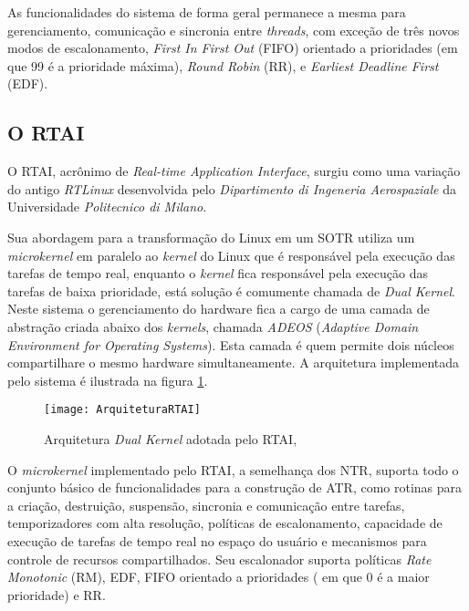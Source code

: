 As funcionalidades do sistema de forma geral permanece a mesma para gerenciamento, comunicação e sincronia entre \textit{threads}, com exceção de três novos modos de escalonamento, \textit{First In First Out} (FIFO) orientado a prioridades (em que 99 é a prioridade máxima), \textit{Round Robin} (RR), e \textit{Earliest Deadline First} (EDF).

\subsection{O RTAI}
O RTAI, acrônimo de \textit{Real-time Application Interface}, surgiu como uma variação do antigo \textit{RTLinux} desenvolvida pelo \textit{Dipartimento di Ingeneria Aerospaziale} da Universidade \textit{Politecnico di Milano}.

Sua abordagem para a transformação do Linux em um SOTR utiliza um \textit{microkernel} em paralelo ao \textit{kernel} do Linux que é responsável pela execução das tarefas de tempo real, enquanto o \textit{kernel} fica responsável pela execução das tarefas de baixa prioridade, está solução é comumente chamada de \textit{Dual Kernel}. Neste sistema o gerenciamento do hardware fica a cargo de uma camada de abstração criada abaixo dos \textit{kernels}, chamada \textit{ADEOS} (\textit{Adaptive Domain Environment for Operating Systems}). Esta camada é quem permite dois  núcleos compartilhare o mesmo hardware simultaneamente. A arquitetura implementada pelo sistema é ilustrada na figura \ref{ArquiteturaRTAI}.

\begin{figure}[!htb]
    \centering
    \texttt{[image: ArquiteturaRTAI]}
    \caption{Arquitetura \textit{Dual Kernel} adotada pelo RTAI, \cite{Litayem2011}}
    \label{ArquiteturaRTAI}
\end{figure}

O \textit{microkernel} implementado pelo RTAI, a semelhança dos NTR, suporta todo o conjunto básico de funcionalidades para a construção de ATR, como rotinas para a criação, destruição, suspensão, sincronia e comunicação entre tarefas, temporizadores com alta resolução, políticas de escalonamento, capacidade de execução de tarefas de tempo real no espaço do usuário e mecanismos para controle de recursos compartilhados. Seu escalonador suporta políticas \textit{Rate Monotonic} (RM), EDF, FIFO orientado a prioridades ( em que 0 é a maior prioridade) e RR.

